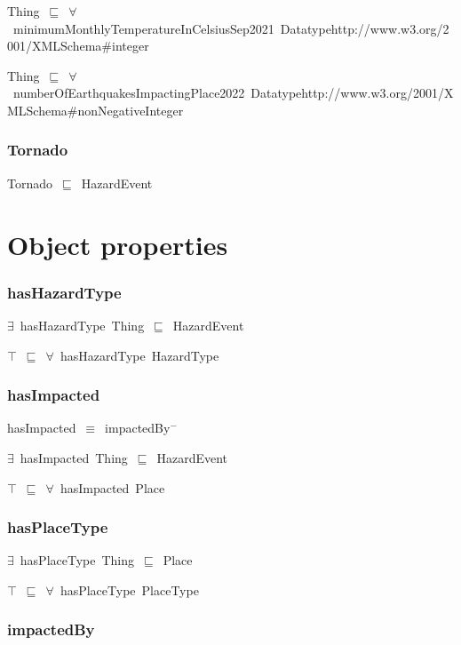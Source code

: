 \documentclass{article}
\begin{document}
Thing~\ensuremath{\sqsubseteq}~\ensuremath{\forall}~minimumMonthlyTemperatureInCelsiusSep2021~Datatypehttp://www.w3.org/2001/XMLSchema#integer~

Thing~\ensuremath{\sqsubseteq}~\ensuremath{\forall}~numberOfEarthquakesImpactingPlace2022~Datatypehttp://www.w3.org/2001/XMLSchema#nonNegativeInteger~

\subsubsection*{Tornado}

Tornado~\ensuremath{\sqsubseteq}~HazardEvent~

\section*{Object properties}\subsubsection*{hasHazardType}

\ensuremath{\exists}~hasHazardType~Thing~\ensuremath{\sqsubseteq}~HazardEvent

\ensuremath{\top}~\ensuremath{\sqsubseteq}~\ensuremath{\forall}~hasHazardType~HazardType

\subsubsection*{hasImpacted}

hasImpacted~\ensuremath{\equiv}~impactedBy\ensuremath{^-}

\ensuremath{\exists}~hasImpacted~Thing~\ensuremath{\sqsubseteq}~HazardEvent

\ensuremath{\top}~\ensuremath{\sqsubseteq}~\ensuremath{\forall}~hasImpacted~Place

\subsubsection*{hasPlaceType}

\ensuremath{\exists}~hasPlaceType~Thing~\ensuremath{\sqsubseteq}~Place

\ensuremath{\top}~\ensuremath{\sqsubseteq}~\ensuremath{\forall}~hasPlaceType~PlaceType

\subsubsection*{impactedBy}
\end{document}
